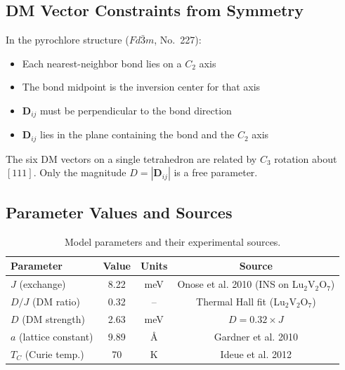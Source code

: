 \documentclass[11pt,letterpaper]{article}
\begin{document}
\subsection{DM Vector Constraints from Symmetry}

\begin{assumption}[title={Moriya's Rules Applied to Pyrochlore}]
In the pyrochlore structure ($Fd\bar{3}m$, No.~227):
\begin{itemize}
    \item Each nearest-neighbor bond lies on a $C_2$ axis
    \item The bond midpoint is the inversion center for that axis
    \item $\bm{D}_{ij}$ must be perpendicular to the bond direction
    \item $\bm{D}_{ij}$ lies in the plane containing the bond and the $C_2$ axis
\end{itemize}

The six DM vectors on a single tetrahedron are related by $C_3$ rotation about $[111]$. Only the magnitude $D = |\bm{D}_{ij}|$ is a free parameter.
\end{assumption}

\subsection{Parameter Values and Sources}

\begin{table}[h]
\centering
\begin{tabular}{lccc}
\toprule
Parameter & Value & Units & Source \\
\midrule
$J$ (exchange) & 8.22 & meV & Onose et al. 2010 (INS on Lu$_2$V$_2$O$_7$) \\
$D/J$ (DM ratio) & 0.32 & -- & Thermal Hall fit (Lu$_2$V$_2$O$_7$) \\
$D$ (DM strength) & 2.63 & meV & $D = 0.32 \times J$ \\
$a$ (lattice constant) & 9.89 & \AA & Gardner et al. 2010 \\
$T_C$ (Curie temp.) & 70 & K & Ideue et al. 2012 \\
\bottomrule
\end{tabular}
\caption{Model parameters and their experimental sources.}
\label{tab:params}
\end{table}
\end{document}

